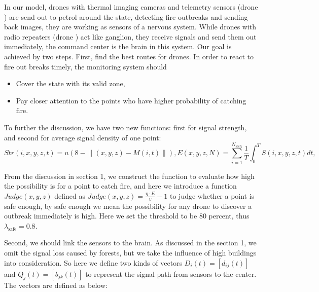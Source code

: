 \documentclass[13pt]{ctexart} %
\begin{document}
In our model, drones with thermal imaging cameras and telemetry sensors (drone \uppercase\expandafter{}) are send out to petrol around the state, detecting fire outbreaks and sending back images, they are working as sensors of a nervous system. While drones with radio repeaters (drone \uppercase\expandafter{}) act like ganglion, they receive signals and send them out immediately, the command center is the brain in this system. Our goal is achieved by two steps. First, find the best routes for drones\uppercase\expandafter{}. In order to react to fire out breaks timely, the monitoring system should

\begin{itemize}
    \item Cover the state with its valid zone,
    \item Pay closer attention to the points who have higher probability of catching fire.
\end{itemize}

To further the discussion, we have two new functions: first for signal strength, and second for average signal density of one point:
\begin{subequations}
    \begin{equation}
        Str(i,x,y,z,t)=u\left(8-\lVert (x,y,z)-M(i,t)\rVert\right),
    \end{equation}
    \begin{equation}
        E(x,y,z,N)=\sum_{i=1}^{N_{\text{SSA}}}\frac{1}{T}\int_{0}^{T}S(i,x,y,z,t)dt,
    \end{equation}
\end{subequations}

From the discussion in section 1, we construct the function \label{PossibilityFire} to evaluate how high the possibility is for a point to catch fire, and here we introduce a function $Judge(x, y,z)$ defined as $Judge(x,y,z)=\frac{\eta \cdot E}{V}-1$ to judge whether a point is safe enough, by safe enough we mean the possibility for any drone \uppercase\expandafter{} to discover a outbreak immediately is high. Here we set the threshold to be 80 percent, thus $\lambda_{\text{safe}}=0.8$.

Second, we should link the sensors to the brain. As discussed in the section 1, we omit the signal loss caused by forests, but we take the influence of high buildings into consideration. So here we define two kinds of vectors $D_i(t)=[d_{ij}(t)]$ and $Q_j(t)=[b_{jk}(t)]$  to represent the signal path from sensors to the center. The vectors are defined as below:
\end{document}
